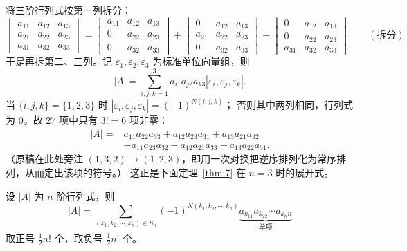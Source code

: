 将三阶行列式按第一列拆分：
\[
\begin{vmatrix}
a_{11}&a_{12}&a_{13}\\
a_{21}&a_{22}&a_{23}\\
a_{31}&a_{32}&a_{33}
\end{vmatrix}
=
\begin{vmatrix}
a_{11}&a_{12}&a_{13}\\
0&a_{22}&a_{23}\\
0&a_{32}&a_{33}
\end{vmatrix}
+
\begin{vmatrix}
0&a_{12}&a_{13}\\
a_{21}&a_{22}&a_{23}\\
0&a_{32}&a_{33}
\end{vmatrix}
+
\begin{vmatrix}
0&a_{12}&a_{13}\\
0&a_{22}&a_{23}\\
a_{31}&a_{32}&a_{33}
\end{vmatrix}
\qquad(\text{拆分})
\]
于是再拆第二、三列。记 $\varepsilon_1,\varepsilon_2,\varepsilon_3$ 为标准单位向量组，则
\[
|A|=\sum_{i,j,k=1}^{3}a_{i1}a_{j2}a_{k3}\left|\varepsilon_i,\varepsilon_j,\varepsilon_k\right|.
\]
当 $\{i,j,k\}=\{1,2,3\}$ 时 $\left|\varepsilon_i,\varepsilon_j,\varepsilon_k\right|=(-1)^{N(i,j,k)}$；
否则其中两列相同，行列式为 $0$。故 $27$ 项中只有 $3!=6$ 项非零：
\begin{align*}
|A|={}&a_{11}a_{22}a_{33}+a_{12}a_{23}a_{31}+a_{13}a_{21}a_{32}\\
&-a_{11}a_{23}a_{32}-a_{12}a_{21}a_{33}-a_{13}a_{22}a_{31}.
\end{align*}
（原稿在此处旁注 $(1,3,2)\to(1,2,3)$，即用一次对换把逆序排列化为常序排列，从而定出该项的符号。）
这正是下面定理~\ref{thm:7} 在 $n=3$ 时的展开式。

\begin{theorem}\label{thm:7}
设 $|A|$ 为 $n$ 阶行列式，则
\[
|A|=\sum_{(k_1,k_2,\cdots,k_n)\in S_n}
(-1)^{N(k_1,k_2,\cdots,k_n)}
\underbrace{a_{k_11}a_{k_22}\cdots a_{k_nn}}_{\text{单项}}
\]
取正号 $\frac12 n!$ 个，取负号 $\frac12 n!$ 个。
\end{theorem}

